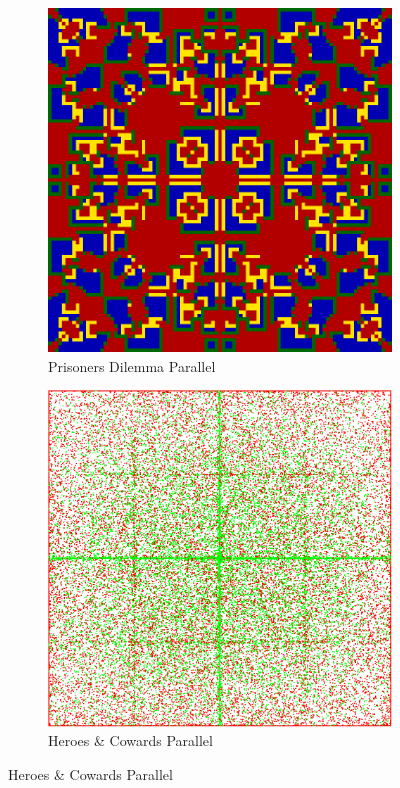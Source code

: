 \begin{figure}
    \begin{subfigure}[b]{0.4\textwidth}
		\centering
       	\includegraphics[width=.7\textwidth, angle=0]{./fig/par_99x99_436steps_MSG_haskell.png}
        \caption{Prisoners Dilemma Parallel}
        \label{fig:pd_par}
    \end{subfigure}
    \begin{subfigure}[b]{0.4\textwidth}
    	\centering
        \includegraphics[width=.7\textwidth, angle=0]{./fig/par_HAC_100_000_500steps_java.png}
        \caption{Heroes \& Cowards Parallel}
        \label{fig:hac_par}
    \end{subfigure}
        


\end{figure}
